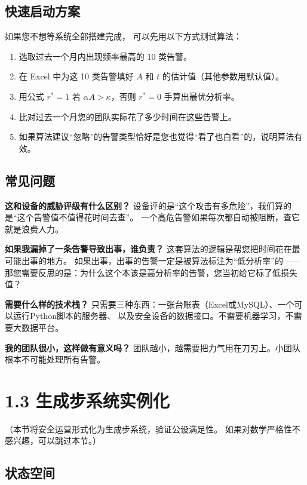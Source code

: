 \documentclass[11pt,a4paper]{article}
\begin{document}
\subsection{快速启动方案}

如果您不想等系统全部搭建完成，
可以先用以下方式测试算法：

\begin{enumerate}[label=(\arabic*)]
    \item 选取过去一个月内出现频率最高的 10 类告警。
    \item 在 Excel 中为这 10 类告警填好 $A$ 和 $t$ 的估计值（其他参数用默认值）。
    \item 用公式 $r^* = 1$ 若 $\alpha A > \kappa$，否则 $r^* = 0$ 手算出最优分析率。
    \item 比对过去一个月您的团队实际花了多少时间在这些告警上。
    \item 如果算法建议“忽略”的告警类型恰好是您也觉得“看了也白看”的，说明算法有效。
\end{enumerate}

\subsection{常见问题}

\textbf{这和设备的威胁评级有什么区别？}
设备评的是“这个攻击有多危险”，我们算的是“这个告警值不值得花时间去查”。
一个高危告警如果每次都自动被阻断，查它就是浪费人力。

\textbf{如果我漏掉了一条告警导致出事，谁负责？}
这套算法的逻辑是帮您把时间花在最可能出事的地方。
如果出事，出事的告警一定是被算法标注为“低分析率”的——
那您需要反思的是：为什么这个本该是高分析率的告警，您当初给它标了低损失值？

\textbf{需要什么样的技术栈？}
只需要三种东西：一张台账表（Excel或MySQL）、一个可以运行Python脚本的服务器、
以及安全设备的数据接口。不需要机器学习，不需要大数据平台。

\textbf{我的团队很小，这样做有意义吗？}
团队越小，越需要把力气用在刀刃上。小团队根本不可能处理所有告警。

\section{1.3 生成步系统实例化}

（本节将安全运营形式化为生成步系统，验证公设满足性。
如果对数学严格性不感兴趣，可以跳过本节。）

\subsection{状态空间}
\end{document}
